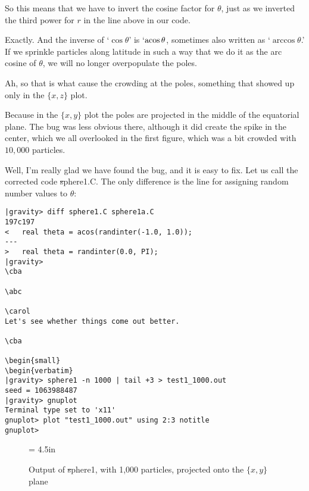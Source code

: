 \abc

\bob
So this means that we have to invert the cosine factor for $\theta$,
just as we inverted the third power for $r$ in the line above in our
code.

\alice
Exactly.  And the inverse of `$\cos \theta$' is `$\rm{acos}\, \theta$,
sometimes also written as `$\arccos \theta$.'  If we
sprinkle particles along latitude in such a way that we do it as the
arc cosine of $\theta$, we will no longer overpopulate the poles.

\carol
Ah, so that is what cause the crowding at the poles, something that
showed up only in the $\{x,z\}$ plot.

\bob
Because in the $\{x,y\}$ plot the poles are projected in the middle of
the equatorial plane.  The bug was less obvious there, although it did
create the spike in the center, which we all overlooked in the first
figure, which was a bit crowded with $10,000$ particles.

\alice
Well, I'm really glad we have found the bug, and it is easy to fix.
Let us call the corrected code {\st sphere1.C}.  The only difference
is the line for assigning random number values to $\theta$:

\cba

\begin{small}
\begin{verbatim}
|gravity> diff sphere1.C sphere1a.C
197c197
< 	real theta = acos(randinter(-1.0, 1.0));
---
> 	real theta = randinter(0.0, PI);
|gravity> 
\cba

\abc

\carol
Let's see whether things come out better.

\cba

\begin{small}
\begin{verbatim}
|gravity> sphere1 -n 1000 | tail +3 > test1_1000.out
seed = 1063988487
|gravity> gnuplot
Terminal type set to 'x11'
gnuplot> plot "test1_1000.out" using 2:3 notitle
gnuplot>
\end{verbatim}
\end{small}

\begin{figure}[htb]
\begin{center}
\epsfxsize = 4.5in
\caption[xy plot of {\st sphere1} output]
{Output of {\st sphere1}, with 1,000 particles, projected onto the
$\{x,y\}$ plane}
\label{fig:sphere1xy1000}
\end{center}
\end{figure}

